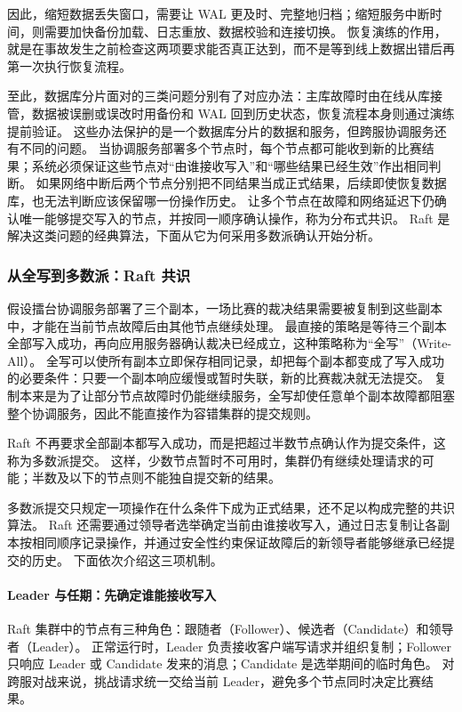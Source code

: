 因此，缩短数据丢失窗口，需要让 WAL 更及时、完整地归档；缩短服务中断时间，则需要加快备份加载、日志重放、数据校验和连接切换。
恢复演练的作用，就是在事故发生之前检查这两项要求能否真正达到，而不是等到线上数据出错后再第一次执行恢复流程。

至此，数据库分片面对的三类问题分别有了对应办法：主库故障时由在线从库接管，数据被误删或误改时用备份和 WAL 回到历史状态，恢复流程本身则通过演练提前验证。
这些办法保护的是一个数据库分片的数据和服务，但跨服协调服务还有不同的问题。
当协调服务部署多个节点时，每个节点都可能收到新的比赛结果；系统必须保证这些节点对“由谁接收写入”和“哪些结果已经生效”作出相同判断。
如果网络中断后两个节点分别把不同结果当成正式结果，后续即使恢复数据库，也无法判断应该保留哪一份操作历史。
让多个节点在故障和网络延迟下仍确认唯一能够提交写入的节点，并按同一顺序确认操作，称为分布式共识。
Raft 是解决这类问题的经典算法，下面从它为何采用多数派确认开始分析。


\subsubsection{从全写到多数派：Raft 共识}
\label{sec4:raft-and-quorum}
\label{sec4:raft-consensus}

假设擂台协调服务部署了三个副本，一场比赛的裁决结果需要被复制到这些副本中，才能在当前节点故障后由其他节点继续处理。
最直接的策略是等待三个副本全部写入成功，再向应用服务器确认裁决已经成立，这种策略称为“全写”（Write-All）。
全写可以使所有副本立即保存相同记录，却把每个副本都变成了写入成功的必要条件：只要一个副本响应缓慢或暂时失联，新的比赛裁决就无法提交。
复制本来是为了让部分节点故障时仍能继续服务，全写却使任意单个副本故障都阻塞整个协调服务，因此不能直接作为容错集群的提交规则。

Raft 不再要求全部副本都写入成功，而是把超过半数节点确认作为提交条件，这称为多数派提交。
这样，少数节点暂时不可用时，集群仍有继续处理请求的可能；半数及以下的节点则不能独自提交新的结果。

多数派提交只规定一项操作在什么条件下成为正式结果，还不足以构成完整的共识算法。
Raft 还需要通过领导者选举确定当前由谁接收写入，通过日志复制让各副本按相同顺序记录操作，并通过安全性约束保证故障后的新领导者能够继承已经提交的历史。
下面依次介绍这三项机制。

\paragraph{Leader 与任期：先确定谁能接收写入}

Raft 集群中的节点有三种角色：跟随者（Follower）、候选者（Candidate）和领导者（Leader）。
正常运行时，Leader 负责接收客户端写请求并组织复制；Follower 只响应 Leader 或 Candidate 发来的消息；Candidate 是选举期间的临时角色。
对跨服对战来说，挑战请求统一交给当前 Leader，避免多个节点同时决定比赛结果。

